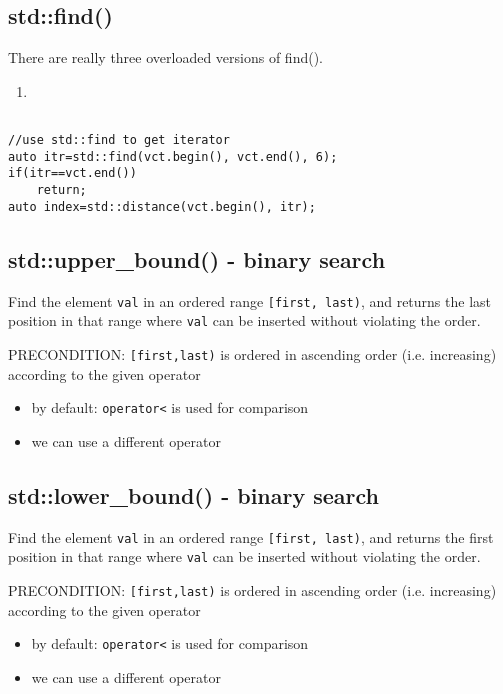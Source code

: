 \subsection{std::find()}
\label{sec:std::find}


 
There are really three overloaded versions of find().
\begin{enumerate}
 \item   
\end{enumerate}

\begin{lstlisting}

//use std::find to get iterator
auto itr=std::find(vct.begin(), vct.end(), 6);
if(itr==vct.end())
    return;
auto index=std::distance(vct.begin(), itr);
\end{lstlisting}

\subsection{std::upper\_bound() - binary search}
\label{sec:std::upper_bound}

Find the element \verb!val! in an ordered range \verb![first, last)!,
and returns the last position in that range where \verb!val! can be inserted
without violating the order.

PRECONDITION: \verb![first,last)! is ordered in ascending order (i.e.
increasing) according to the given operator
\begin{itemize}
  \item by default: \verb!operator<! is used for comparison

  \item we can use a different operator
  
\end{itemize}

\subsection{std::lower\_bound() - binary search}
\label{sec:std::lower_bound}

Find the element \verb!val! in an ordered range \verb![first, last)!,
and returns the first position in that range where \verb!val! can be inserted
without violating the order.

PRECONDITION: \verb![first,last)! is ordered in ascending order (i.e.
increasing) according to the given operator
\begin{itemize}
  \item by default: \verb!operator<! is used for comparison

  \item we can use a different operator
  
\end{itemize}

